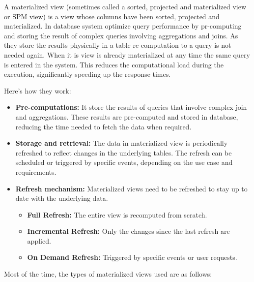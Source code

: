 A materialized view (sometimes called a sorted, projected and materialized view or SPM view) is a view whose columns have been sorted, projected and materialized.\cite{IBM} In database system optimize query performance by pr-computing and storing the result of complex queries involving aggregations and joins. As they store the results physically in a table re-computation to a query is not needed again. When it is view is already materialized at any time the same query is entered in the system. This reduces the computational load during the execution, significantly speeding up the response times.\vspace{.4cm}

Here's how they work:
\begin{itemize}
    \item\textbf{Pre-computations:} It store the results of queries that involve complex join and aggregations. These results are pre-computed and stored in database, reducing the time needed to fetch the data when required.
    \item\textbf{Storage and retrieval:} The data in materialized view is periodically refreshed to reflect changes in the underlying tables. The refresh can be scheduled or triggered by specific events, depending on the use case and requirements.
    \item\textbf{Refresh mechanism:}  Materialized views need to be refreshed to stay up to date with the underlying data.\vspace{.4cm}

    \begin{itemize}
        \item\textbf{Full Refresh:} The entire view is recomputed from scratch.
        \item\textbf{Incremental Refresh:} Only the changes since the last refresh are applied.
        \item\textbf{On Demand Refresh:} Triggered by specific events or user requests.
    \end{itemize}
\end{itemize}\vspace{.4cm}

Most of the time, the types of materialized views used are as follows:\vspace{.4cm}


